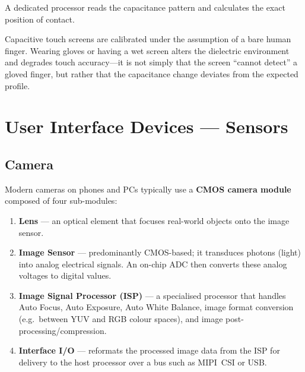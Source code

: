 \documentclass[11pt, a4paper, notitlepage]{report}
\theoremstyle{definition}
\theoremstyle{remark}
\theoremstyle{definition}
\begin{document}
A dedicated processor reads the capacitance pattern and calculates the exact position of contact.

\begin{warning}[title={Common Misconception: Touch Screens and Gloves}]
  Capacitive touch screens are calibrated under the assumption of a bare human finger. Wearing gloves or having a wet screen alters the dielectric environment and degrades touch accuracy---it is not simply that the screen ``cannot detect'' a gloved finger, but rather that the capacitance change deviates from the expected profile.
\end{warning}


\section{User Interface Devices --- Sensors}
\label{sec:ui-sensors}

\subsection{Camera}
\label{sec:camera}

Modern cameras on phones and PCs typically use a \textbf{CMOS camera module} composed of four sub-modules:

\begin{enumerate}
  \item \textbf{Lens} --- an optical element that focuses real-world objects onto the image sensor.
  \item \textbf{Image Sensor} --- predominantly CMOS-based; it transduces photons (light) into analog electrical signals. An on-chip ADC then converts these analog voltages to digital values.
  \item \textbf{Image Signal Processor (ISP)} --- a specialised processor that handles Auto Focus, Auto Exposure, Auto White Balance, image format conversion (e.g.\ between YUV and RGB colour spaces), and image post-processing/compression.
  \item \textbf{Interface I/O} --- reformats the processed image data from the ISP for delivery to the host processor over a bus such as MIPI~CSI or USB.
\end{enumerate}

\end{document}
